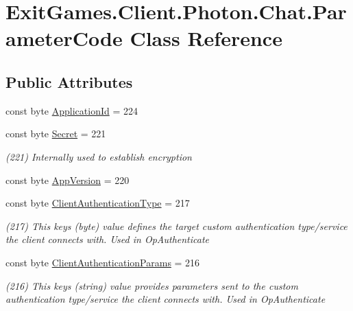 \hypertarget{class_exit_games_1_1_client_1_1_photon_1_1_chat_1_1_parameter_code}{}\section{Exit\+Games.\+Client.\+Photon.\+Chat.\+Parameter\+Code Class Reference}
\label{class_exit_games_1_1_client_1_1_photon_1_1_chat_1_1_parameter_code}
\subsection*{Public Attributes}
\begin{DoxyCompactItemize}
\item 
const byte \hyperlink{class_exit_games_1_1_client_1_1_photon_1_1_chat_1_1_parameter_code_a3e0593b8bebedc54bb00c47d6b079409}{Application\+Id} = 224
\item 
const byte \hyperlink{class_exit_games_1_1_client_1_1_photon_1_1_chat_1_1_parameter_code_a8024f1b6758fb3fa6bcb54581965d7c9}{Secret} = 221
\begin{DoxyCompactList}\small\item\em (221) Internally used to establish encryption\end{DoxyCompactList}\item 
const byte \hyperlink{class_exit_games_1_1_client_1_1_photon_1_1_chat_1_1_parameter_code_a2baac6007f6dfe71804735eb52225e9a}{App\+Version} = 220
\item 
const byte \hyperlink{class_exit_games_1_1_client_1_1_photon_1_1_chat_1_1_parameter_code_a244b3fc5ac2e8b3a97428b6534ca9da6}{Client\+Authentication\+Type} = 217
\begin{DoxyCompactList}\small\item\em (217) This key\textquotesingle{}s (byte) value defines the target custom authentication type/service the client connects with. Used in Op\+Authenticate\end{DoxyCompactList}\item 
const byte \hyperlink{class_exit_games_1_1_client_1_1_photon_1_1_chat_1_1_parameter_code_a70f578a01789db64e2aefa055fba1732}{Client\+Authentication\+Params} = 216
\begin{DoxyCompactList}\small\item\em (216) This key\textquotesingle{}s (string) value provides parameters sent to the custom authentication type/service the client connects with. Used in Op\+Authenticate\end{DoxyCompactList}\item 

\end{DoxyCompactItemize}
